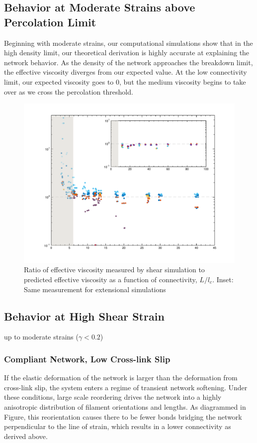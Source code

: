 \documentclass[pre,preprint]{revtex4-1}
\begin{document}
\subsection{Behavior at Moderate Strains above Percolation Limit}
Beginning with moderate strains, our computational simulations show that in the high density limit, our theoretical derivation is highly accurate at explaining the network behavior.  As the density of the network approaches the breakdown limit, the effective viscosity diverges from our expected value.  At the low connectivity limit, our expected viscosity goes to 0, but the medium viscosity begins to take over as we cross the percolation threshold.  
\begin{figure}[h!]
\centering
\includegraphics[width=\hsize]{eff_vic_master}
\caption{\label{fig:effvic}Ratio of effective viscosity measured by shear simulation to predicted effective viscosity as a function of connectivity, $L/l_c$. Inset: Same measurement for extensional simulations }
\end{figure}
\subsection{Behavior at High Shear Strain}
up to moderate strains ($\gamma<0.2$)

\subsubsection{Compliant Network, Low Cross-link Slip}
\label{sec:compliant}
If the elastic deformation of the network is larger than the deformation from cross-link slip, the system enters a regime of transient network softening.  Under these conditions, large scale reordering drives the network into a highly anisotropic distribution of filament orientations and lengths. As diagrammed in Figure, this reorientation causes there to be fewer bonds bridging the network perpendicular to the line of strain, which results in a lower connectivity as derived above.
\end{document}
